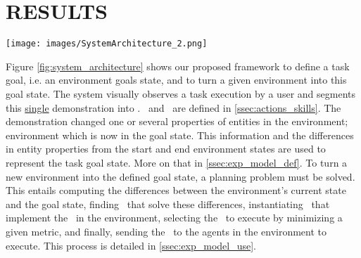\section{RESULTS}

\begin{figure*}[t!]
    \centering
    \texttt{[image: images/SystemArchitecture\_2.png]}
    \caption{From a single user demonstration, the system extracts the desired task goal state with the help of user interaction to solve ambiguities. Using the created environment variation, the system computes a task execution plan to bring new environments into the goal state. It sends the plan to agents in the environment to execute.} \label{fig:system_architecture}
\end{figure*}

Figure \ref{fig:system_architecture} shows our proposed framework to define a task goal, i.e. an environment goals state, and to turn a given environment into this goal state. The system visually observes a task execution by a user and segments this \underline{single} demonstration into \skills. \actions\ and \skills\ are defined in \ref{ssec:actions_skills}. The demonstration changed one or several properties of entities in the environment; environment which is now in the goal state. This information and the differences in entity properties from the start and end environment states are used to represent the task goal state. More on that in \ref{ssec:exp_model_def}. To turn a new environment into the defined goal state, a planning problem must be solved. This entails computing the differences between the environment's current state and the goal state, finding \actions\ that solve these differences, instantiating \skills\ that implement the \actions\ in the environment, selecting the \skills\ to execute by minimizing a given metric, and finally, sending the \skills\ to the agents in the environment to execute. This process is detailed in \ref{ssec:exp_model_use}.



